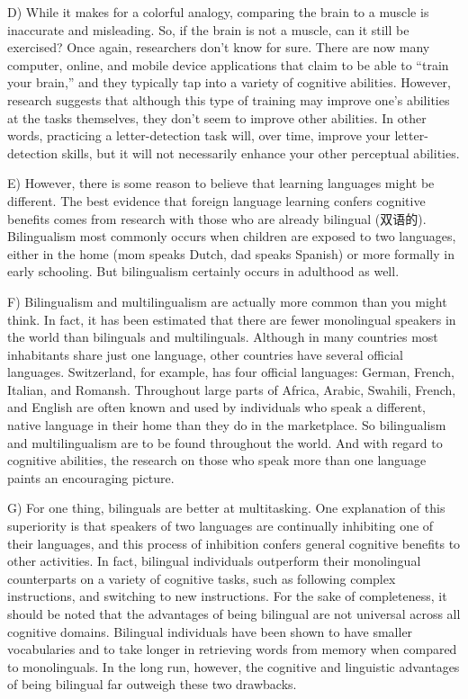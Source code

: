 \documentclass[UTF8,11pt]{ctexart}
\begin{document}
D) While it makes for a colorful analogy, comparing the brain to a muscle is inaccurate and misleading. So, if the brain is not a muscle, can it still be exercised? Once again, researchers don’t know for sure. There are now many computer, online, and mobile device applications that claim to be able to “train your brain,” and they typically tap into a variety of cognitive abilities. However, research suggests that although this type of training may improve one’s abilities at the tasks themselves, they don’t seem to improve other abilities. In other words, practicing a letter-detection task will, over time, improve your letter-detection skills, but it will not necessarily enhance your other perceptual abilities.


E) However, there is some reason to believe that learning languages might be different. The best evidence that foreign language learning confers cognitive benefits comes from research with those who are already bilingual (双语的). Bilingualism most commonly occurs when children are exposed to two languages, either in the home (mom speaks Dutch, dad speaks Spanish) or more formally in early schooling. But bilingualism certainly occurs in adulthood as well.


F) Bilingualism and multilingualism are actually more common than you might think. In fact, it has been estimated that there are fewer monolingual speakers in the world than bilinguals and multilinguals. Although in many countries most inhabitants share just one language, other countries have several official languages. Switzerland, for example, has four official languages: German, French, Italian, and Romansh. Throughout large parts of Africa, Arabic, Swahili, French, and English are often known and used by individuals who speak a different, native language in their home than they do in the marketplace. So bilingualism and multilingualism are to be found throughout the world. And with regard to cognitive abilities, the research on those who speak more than one language paints an encouraging picture.


G) For one thing, bilinguals are better at multitasking. One explanation of this superiority is that speakers of two languages are continually inhibiting one of their languages, and this process of inhibition confers general cognitive benefits to other activities. In fact, bilingual individuals outperform their monolingual counterparts on a variety of cognitive tasks, such as following complex instructions, and switching to new instructions. For the sake of completeness, it should be noted that the advantages of being bilingual are not universal across all cognitive domains. Bilingual individuals have been shown to have smaller vocabularies and to take longer in retrieving words from memory when compared to monolinguals. In the long run, however, the cognitive and linguistic advantages of being bilingual far outweigh these two drawbacks.
\end{document}
